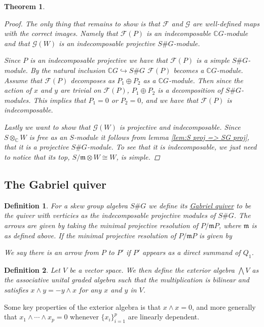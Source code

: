 \documentclass[11pt, a4paper, english]{article}
\numberwithin{prop}{section}
\numberwithin{lemma}{section}
\newtheorem{theorem}{Theorem}
\numberwithin{theorem}{section}
\newtheorem{defin}{Definition}
\numberwithin{defin}{section}
\numberwithin{example}{section}
\newcommand{\C}{\mathbb{C}}
\begin{document}
\begin{theorem}
\begin{proof}
The only thing that remains to show is that $\mathcal{F}$ and $\mathcal{G}$ are well-defined maps with the correct images. Namely that $\mathcal{F}(P)$ is an indecomposable $\C G$-module and that $\mathcal{G}(W)$ is an indecomposable projective $S\#G$-module.

Since $P$ is an indecomposable projective we have that $\mathcal{F}(P)$ is a simple $S\#G$-module. By the natural inclusion $\C G \hookrightarrow S\#G$ $\mathcal{F}(P)$ becomes a $\C G$-module. Assume that $\mathcal{F}(P)$ decomposes as $P_1 \oplus P_2$ as a $\C G$-module. Then since the action of $x$ and $y$ are trivial on $\mathcal{F}(P)$, $P_1 \oplus P_2$ is a decomposition of $S\#G$-modules. This implies that $P_1 = 0$ or $P_2=0$, and we have that $\mathcal{F}(P)$ is indecomposable.

Lastly we want to show that $\mathcal{G}(W)$ is projective and indecomposable. Since $S \otimes_\C W$ is free as an $S$-module it follows from lemma \ref{lem:S proj => SG proj}, that it is a projective $S\#G$-module. To see that it is indecomposable, we just need to notice that its top, $S/\mathfrak{m} \otimes W \cong W$, is simple.
\end{proof}
\fi

\end{theorem}

\subsection{The Gabriel quiver}

\begin{defin}
For a skew group algebra $S\#G$ we define its \underline{Gabriel quiver} to be the quiver with verticies as the indecomposable projective modules of $S\#G$. The arrows are given by taking the minimal projective resolution of $P/\mathfrak{m}P$, where $\mathfrak{m}$ is as defined above. If the minimal projective resolution of $P/\mathfrak{m}P$ is given by
\begin{center}
\end{center}
We say there is an arrow from $P$ to $P'$ if $P'$ appears as a direct summand of $Q_1$.
\end{defin}

\begin{defin}
Let $V$ be a vector space. We then define the exterior algebra $\bigwedge V$ as the associative unital graded algebra such that the multiplication is bilinear and satisfies $x \wedge y = -y \wedge x$ for any $x$ and $y$ in $V$. 
\end{defin}
Some key properties of the exterior algebra is that $x \wedge x = 0$, and more generally that $x_1 \wedge \cdots \wedge x_p = 0$ whenever $\{x_i\}_{i=1}^p$ are linearly dependent.
\end{document}
